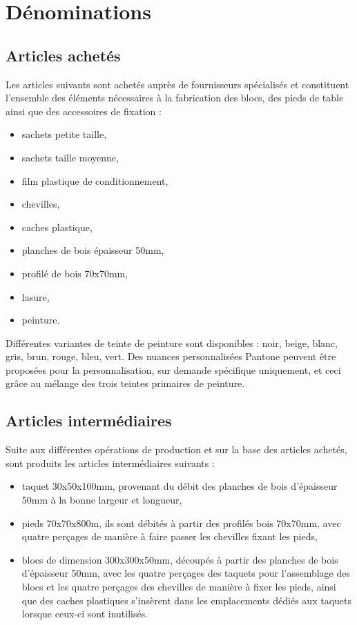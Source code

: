 \section{Dénominations}

\subsection{Articles achetés}

Les articles suivants sont achetés auprès de fournisseurs spécialisés
et constituent l'ensemble des éléments nécessaires à la fabrication des blocs,
des pieds de table ainsi que des accessoires de fixation :

\begin{itemize}
	\item sachets petite taille,
	\item sachets taille moyenne,
	\item film plastique de conditionnement,
	\item chevilles,
	\item caches plastique,
	\item planches de bois épaisseur 50mm,
	\item profilé de bois 70x70mm,
	\item lasure,
	\item peinture.
\end{itemize}

Différentes variantes de teinte de peinture sont disponibles :
noir, beige, blanc, gris, brun, rouge, bleu, vert.
Des nuances personnalisées Pantone\textregistered{} peuvent être proposées
pour la personnalisation, sur demande spécifique uniquement, et ceci grâce
au mélange des trois teintes primaires de peinture.

\subsection{Articles intermédiaires}

Suite aux différentes opérations de production et sur la base des articles
achetés, sont produits les articles intermédiaires suivants :

\begin{itemize}
	\item taquet 30x50x100mm, provenant du débit des planches de bois
	d'épaisseur 50mm à la bonne largeur et longueur,
	\item pieds 70x70x800m, ils sont débités à partir des profilés bois
	70x70mm, avec quatre perçages de manière à faire passer les chevilles
	fixant les pieds,
	\item blocs de dimension 300x300x50mm, découpés à partir des planches de
	bois d'épaisseur 50mm, avec les quatre perçages des taquets pour l'assemblage
	des blocs et les quatre perçages des chevilles de manière à fixer les pieds,
	ainsi que des caches plastiques s'insèrent dans les emplacements dédiés
	aux taquets lorsque ceux-ci sont inutilisés.
\end{itemize}

